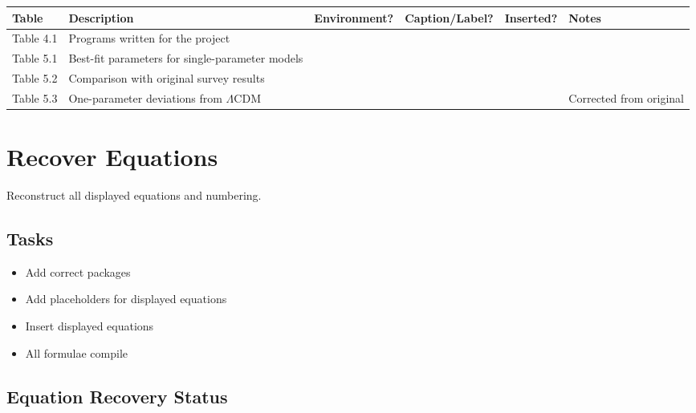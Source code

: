 \documentclass{article}
\newcommand{\done}{\textcolor{green!60!black}{\ding{51}}}
\begin{document}
\begin{longtable}{|p{1.6cm} | p{5.5cm} c c c p{3cm}|}
\hline
Table &
Description &
Environment? &
Caption/Label? &
Inserted? &
Notes \\
\hline
\endhead
\hline
\endfoot

Table 4.1 &
Programs written for the project &
\done & \done & \done & \\

Table 5.1 &
Best-fit parameters for single-parameter models &
\done & \done & \done & \\

Table 5.2 &
Comparison with original survey results &
\done & \done & \done &  \\

Table 5.3 &
One-parameter deviations from $\Lambda$CDM &
\done & \done & \done & Corrected from original
\end{longtable}

\section{\done Recover Equations}

Reconstruct all displayed equations and numbering.

\subsection{Tasks}
\begin{itemize}
\item[\done] Add correct packages
\item[\done] Add placeholders for displayed equations
\item[\done] Insert displayed equations
\item[\done] All formulae compile
\end{itemize}

\subsection{Equation Recovery Status}
\end{document}
